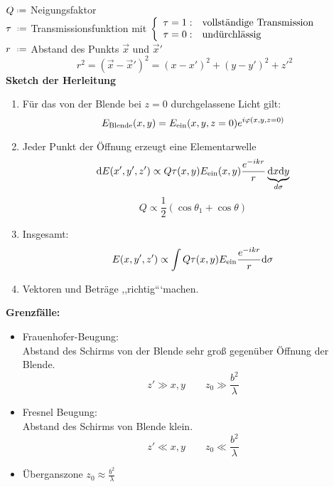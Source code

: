 \noindent
$ Q \defeq $ Neigungsfaktor\\
$ \tau \; \defeq $ Transmissionsfunktion mit $ \left\{ \begin{array}{ll}
\tau = 1 : & \textrm{vollständige Transmission} \\ \tau = 0 : & \textrm{undürchlässig}
\end{array} \right. $\\
$ r \ \defeq $ Abstand des Punkts $ \vec{x} $ und $ \vec{x}' $
\begin{equation*}
r^2 = (\vec{x} - \vec{x}')^2 = (x-x')^2 + (y-y')^2 + z'^2
\end{equation*}
\textbf{Sketch der Herleitung}
\begin{enumerate}[(1)]
	\item Für das von der Blende bei $ z = 0 $ durchgelassene Licht gilt:
	\begin{equation*}
	E_{\textrm{Blende}} (x,y) = E_{\textrm{ein}} (x,y,z=0) e^{i\varphi (x,y,z=0)}
	\end{equation*}
	\item Jeder Punkt der Öffnung erzeugt eine Elementarwelle
	\begin{equation*}
	\textrm{d} E(x',y',z') \propto Q \tau(x,y) E_{\textrm{ein}} (x,y) \frac{e^{-ikr}}{r} \underbrace{\textrm{d} x \textrm{d} y}_{d\sigma}
	\end{equation*}
	\begin{equation*}
	Q \propto \frac{1}{2} (\cos \theta_1 + \cos \theta)
	\end{equation*}
	\item Insgesamt:
	\begin{equation*}
	E(x,y',z') \propto \int Q \tau(x,y) E_{\textrm{ein}} \frac{e^{-ikr}}{r} \textrm{d} \sigma
	\end{equation*}
	\item  Vektoren und Beträge ,,richtig```machen.
\end{enumerate}
\textbf{Grenzfälle:}
\begin{itemize}
	\item Frauenhofer-Beugung:\\
	Abstand des Schirms von der Blende sehr groß gegenüber Öffnung der Blende.
	\begin{equation*}
	z' \gg x,y \qquad z_0 \gg \frac{b^2}{\lambda}
	\end{equation*}
	\item Fresnel Beugung:\\
	Abstand des Schirms von Blende klein.
	\begin{equation*}
	z' \ll x,y \qquad z_0 \ll \frac{b^2}{\lambda}
	\end{equation*}
	\item Überganszone $ z_0 \approx \frac{b^2}{\lambda} $
\end{itemize}

